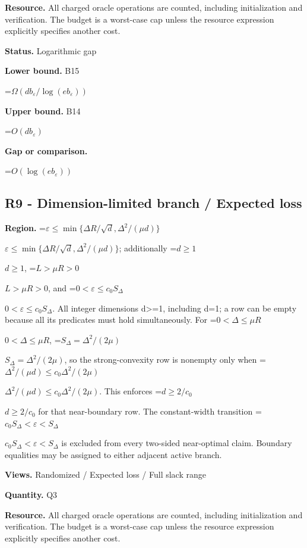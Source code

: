 \documentclass[10pt,a4paper]{article}
\newcommand{\AtlasMath}[1]{\par\begingroup\centering\setbox0=\hbox{$\displaystyle #1$}\ifdim\wd0>1.4\linewidth\typeout{ATLAS WIDE FORMULA: \the\wd0}\fi\ifdim\wd0>\linewidth\resizebox{\linewidth}{!}{\box0}\else\box0\fi\par\endgroup}
\newcommand{\AtlasInlineMath}[1]{\begingroup\setbox0=\hbox{$#1$}\ifdim\wd0>.4\linewidth\endgroup\AtlasMath{#1}\else\endgroup$#1$\fi}
\begin{document}
\textbf{Resource.} All charged oracle operations are counted, including initialization and verification. The budget is a worst-case cap unless the resource expression explicitly specifies another cost.



\textbf{Status.} Logarithmic gap



\textbf{Lower bound.} B15



\AtlasMath{\Omega(db_\varepsilon/\log(eb_\varepsilon))}


\textbf{Upper bound.} B14



\AtlasMath{O(db_\varepsilon)}


\textbf{Gap or comparison.}



\AtlasMath{O(\log(eb_\varepsilon))}


\subsection{R9 - Dimension-limited branch / Expected loss}


\textbf{Region.} \AtlasInlineMath{\varepsilon\le\min\{\Delta R/\sqrt d,\Delta^2/(\mu d)\}}; additionally \AtlasInlineMath{d\ge1}, \AtlasInlineMath{L>\mu R>0}, and \AtlasInlineMath{0<\varepsilon\le c_0S_\Delta}. All integer dimensions d>=1, including d=1; a row can be empty because all its predicates must hold simultaneously. For \AtlasInlineMath{0<\Delta\le\mu R}, \AtlasInlineMath{S_\Delta=\Delta^2/(2\mu)}, so the strong-convexity row is nonempty only when \AtlasInlineMath{\Delta^2/(\mu d)\le c_0\Delta^2/(2\mu)}. This enforces \AtlasInlineMath{d\ge2/c_0} for that near-boundary row. The constant-width transition \AtlasInlineMath{c_0S_\Delta<\varepsilon<S_\Delta} is excluded from every two-sided near-optimal claim. Boundary equalities may be assigned to either adjacent active branch.



\textbf{Views.} Randomized / Expected loss / Full slack range



\textbf{Quantity.} Q3



\textbf{Resource.} All charged oracle operations are counted, including initialization and verification. The budget is a worst-case cap unless the resource expression explicitly specifies another cost.
\end{document}
